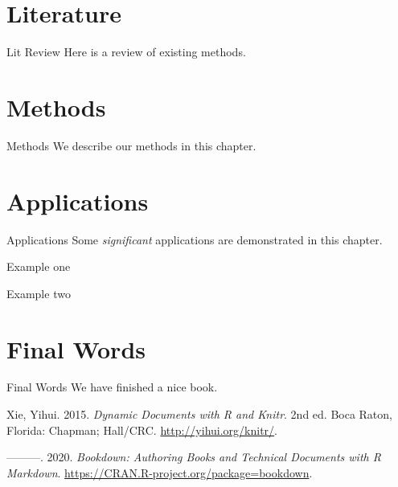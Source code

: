 \documentclass[
  ignorenonframetext,
  noamsthm,11pt,a4paper,blue,xcolor=table]{beamer}
\newlength{\cslhangindent}
\newenvironment{cslreferences}%
  {\setlength{\parindent}{0pt}%
  \everypar{\setlength{\hangindent}{\cslhangindent}}\ignorespaces}%
  {\par}
\begin{document}
\hypertarget{literature}{%
\section{Literature}\label{literature}}

\begin{frame}{Lit Review}
\protect\hypertarget{lit-review}{}
Here is a review of existing methods.
\end{frame}

\hypertarget{methods}{%
\section{Methods}\label{methods}}

\begin{frame}{Methods}
We describe our methods in this chapter.
\end{frame}

\hypertarget{applications}{%
\section{Applications}\label{applications}}

\begin{frame}{Applications}
Some \emph{significant} applications are demonstrated in this chapter.
\end{frame}

\begin{frame}{Example one}
\protect\hypertarget{example-one}{}
\end{frame}

\begin{frame}{Example two}
\protect\hypertarget{example-two}{}
\end{frame}

\hypertarget{final-words}{%
\section{Final Words}\label{final-words}}

\begin{frame}{Final Words}
We have finished a nice book.

\hypertarget{refs}{}
\begin{cslreferences}
\leavevmode\hypertarget{ref-xie2015}{}%
Xie, Yihui. 2015. \emph{Dynamic Documents with R and Knitr}. 2nd ed. Boca Raton, Florida: Chapman; Hall/CRC. \url{http://yihui.org/knitr/}.

\leavevmode\hypertarget{ref-R-bookdown}{}%
---------. 2020. \emph{Bookdown: Authoring Books and Technical Documents with R Markdown}. \url{https://CRAN.R-project.org/package=bookdown}.
\end{cslreferences}
\end{frame}

\mode*
\end{document}
